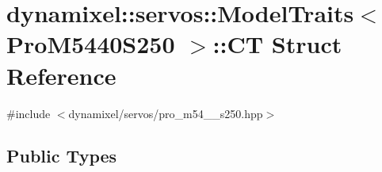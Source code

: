 \hypertarget{structdynamixel_1_1servos_1_1_model_traits_3_01_pro_m5440_s250_01_4_1_1_c_t}{}\section{dynamixel\+:\+:servos\+:\+:Model\+Traits$<$ Pro\+M5440\+S250 $>$\+:\+:CT Struct Reference}
\label{structdynamixel_1_1servos_1_1_model_traits_3_01_pro_m5440_s250_01_4_1_1_c_t}


{\ttfamily \#include $<$dynamixel/servos/pro\+\_\+m54\+\_\+\_\+s250.\+hpp$>$}

\subsection*{Public Types}
